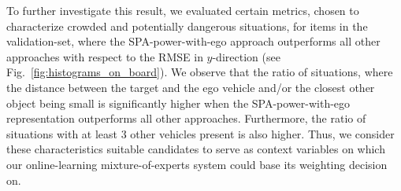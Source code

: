 To further investigate this result, we evaluated certain metrics, chosen to characterize crowded and potentially dangerous situations, for items in the validation-set, where the \ac{SPA}-power-with-ego approach outperforms all other approaches with respect to the \ac{RMSE} in $y$-direction (see Fig.~\ref{fig:histograms_on_board}).
We observe that the ratio of situations, where the distance between the target and the ego vehicle and/or the closest other object being small is significantly higher when the \ac{SPA}-power-with-ego representation outperforms all other approaches.
Furthermore, the ratio of situations with at least \num{3} other vehicles present is also higher.
Thus, we consider these characteristics suitable candidates to serve as context variables on which our online-learning mixture-of-experts system could base its weighting decision on.
\begin{figure}[t!]
	\centering
\end{figure}
